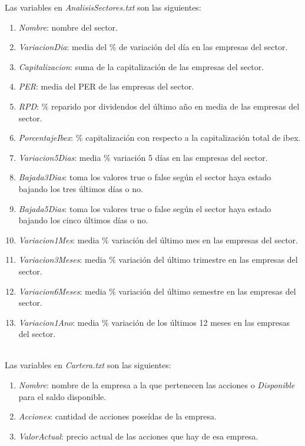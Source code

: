 \documentclass[12pt]{article}
\begin{document}
Las variables en \textit{AnalisisSectores.txt} son las siguientes:
\begin{enumerate}
\item \textit{Nombre}: nombre del sector.
\item \textit{VariacionDia}: media del \% de variación del día en las empresas del sector.
\item \textit{Capitalizacion}: suma de la capitalización de las empresas del sector.
\item \textit{PER}: media del PER de las empresas del sector.
\item \textit{RPD}: \% reparido por dividendos del último año en media de las empresas del sector.
\item \textit{PorcentajeIbex}: \% capitalización con respecto a la capitalización total de ibex.
\item \textit{Variacion5Dias}: media \% variación 5 días en las empresas del sector.
\item \textit{Bajada3Dias}: toma los valores true o false según el sector haya estado bajando los tres últimos días o no.
\item \textit{Bajada5Dias}: toma los valores true o false según el sector haya estado bajando los cinco últimos días o no.
\item \textit{Variacion1Mes}: media \% variación del último mes en las empresas del sector.
\item \textit{Variacion3Meses}: media \% variación del último trimestre en las empresas del sector.
\item \textit{Variacion6Meses}: media \% variación del último semestre en las empresas del sector.
\item \textit{Variacion1Ano}: media \% variación de los últimos 12 meses en las empresas del sector.
\end{enumerate}
\textit{ }\\

Las variables en \textit{Cartera.txt} son las siguientes:
\begin{enumerate}
\item \textit{Nombre}: nombre de la empresa a la que pertenecen las acciones o \textit{Disponible} para el saldo disponible.
\item \textit{Acciones}: cantidad de acciones poseídas de la empresa.
\item \textit{ValorActual}: precio actual de las acciones que hay de esa empresa.
\end{enumerate}
\textit{ }\\
\end{document}
